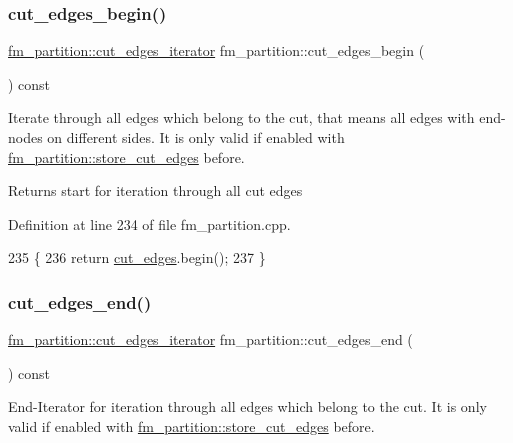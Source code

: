 \subsubsection{\texorpdfstring{cut\+\_\+edges\+\_\+begin()}{cut\_edges\_begin()}}
{\footnotesize\ttfamily \mbox{\hyperlink{classfm__partition_a15e854cf1efcae91d05a48f2a9fd0761}{fm\+\_\+partition\+::cut\+\_\+edges\+\_\+iterator}} fm\+\_\+partition\+::cut\+\_\+edges\+\_\+begin (\begin{DoxyParamCaption}{ }\end{DoxyParamCaption}) const}

Iterate through all edges which belong to the cut, that means all edges with end-\/nodes on different sides. It is only valid if enabled with \mbox{\hyperlink{classfm__partition_ad0870674a1fb8e1c882f6855e32aec09}{fm\+\_\+partition\+::store\+\_\+cut\+\_\+edges}} before.

\begin{DoxyReturn}{Returns}
start for iteration through all cut edges 
\end{DoxyReturn}


Definition at line 234 of file fm\+\_\+partition.\+cpp.


\begin{DoxyCode}
235 \{
236     \textcolor{keywordflow}{return} \mbox{\hyperlink{classfm__partition_ad71b58a8f73cc834d49304252fb4a288}{cut\_edges}}.begin();
237 \}
\end{DoxyCode}
\mbox{\label{classfm__partition_af213672f08e03878183659fa8c2ed61e}} 
\subsubsection{\texorpdfstring{cut\+\_\+edges\+\_\+end()}{cut\_edges\_end()}}
{\footnotesize\ttfamily \mbox{\hyperlink{classfm__partition_a15e854cf1efcae91d05a48f2a9fd0761}{fm\+\_\+partition\+::cut\+\_\+edges\+\_\+iterator}} fm\+\_\+partition\+::cut\+\_\+edges\+\_\+end (\begin{DoxyParamCaption}{ }\end{DoxyParamCaption}) const}

End-\/\+Iterator for iteration through all edges which belong to the cut. It is only valid if enabled with \mbox{\hyperlink{classfm__partition_ad0870674a1fb8e1c882f6855e32aec09}{fm\+\_\+partition\+::store\+\_\+cut\+\_\+edges}} before.

